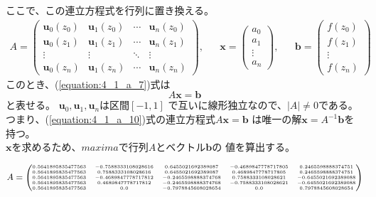 \begin{enumerate}
  ここで、この連立方程式を行列に置き換える。
  \begin{align}\label{equation:4_1_a_9}
    A = \begin{pmatrix}
      \bm{u}_{0}(z_{0}) & \bm{u}_{1}(z_{0}) & \cdots & \bm{u}_{n}(z_{0}) \\
      \bm{u}_{0}(z_{1}) & \bm{u}_{1}(z_{1}) & \cdots & \bm{u}_{n}(z_{1}) \\
      \vdots            & \vdots            & \ddots & \vdots            \\
      \bm{u}_{0}(z_{n}) & \bm{u}_{1}(z_{n}) & \cdots & \bm{u}_{n}(z_{n})
    \end{pmatrix}
    , & &
    \bm{x} = \begin{pmatrix}
      a_{0} \\ a_{1} \\ \vdots \\ a_{n}
    \end{pmatrix}
    , & &
    \bm{b} = \begin{pmatrix}
      f(z_0) \\ f(z_1) \\ \vdots \\ f(z_n)
    \end{pmatrix}
  \end{align}
  このとき、(\ref{equation:4_1_a_7})式は
  \begin{equation}\label{equation:4_1_a_10}
    A \bm{x} = \bm{b}
  \end{equation}
  と表せる。
  \(\bm{u}_{0}, \bm{u}_{1}, \bm{u}_{n}\)は区間\(\left[-1, 1\right]\)
  で互いに線形独立なので、\(|A| \neq 0\)である。
  つまり、(\ref{equation:4_1_a_10})式の連立方程式\(A \bm{x} = \bm{b}\)
  は唯一の解\(\bm{x} = A^{-1} \bm{b}\)を持つ。\\
  \(\bm{x}\)を求めるため、\(maxima\)で行列\(A\)とベクトル\(\bm{b}\)の
  値を算出する。

  \begin{equation}
    {
      \tiny
      A = \begin{pmatrix}
        0.5641895835477563 & -0.7588333108028616 & 0.6455021692389087 & -0.4689847778717805 & 0.2465598888374751\\
        0.5641895835477563 & 0.7588333108028616 & 0.6455021692389087 & 0.4689847778717805 & 0.2465598888374751\\
        0.5641895835477563 & -0.4689847778717812 & -0.2465598888374768 & 0.7588333108028621 & -0.6455021692389088\\
        0.5641895835477563 & 0.4689847778717812 & -0.2465598888374768 & -0.7588333108028621 & -0.6455021692389088\\
        0.5641895835477563 & 0.0 & -0.7978845608028654 & 0.0 & 0.7978845608028654
      \end{pmatrix}
    }
  \end{equation}


\end{enumerate}
